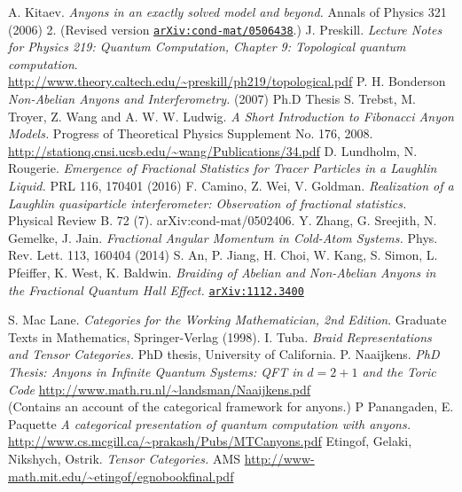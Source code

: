 \begin{thebibliography}{99}
   A. Kitaev. \textit{Anyons in an exactly solved model and beyond.} Annals of Physics 321 (2006) 2. (Revised version \href{https://arxiv.org/abs/cond-mat/0506438}{\texttt{arXiv:cond-mat/0506438}}.)%
   J. Preskill. \textit{Lecture Notes for Physics 219: Quantum Computation, Chapter 9: Topological quantum computation}. \\ \url{http://www.theory.caltech.edu/~preskill/ph219/topological.pdf}
   P. H. Bonderson \textit{Non-Abelian Anyons and Interferometry.} (2007) Ph.D Thesis
   S. Trebst, M. Troyer, Z. Wang and A. W. W. Ludwig. \textit{A Short Introduction to Fibonacci Anyon Models.} Progress of Theoretical Physics Supplement No. 176, 2008. \\ \url{http://stationq.cnsi.ucsb.edu/~wang/Publications/34.pdf}
   D. Lundholm, N. Rougerie. \textit{Emergence of Fractional Statistics for Tracer Particles in a Laughlin Liquid.} PRL 116, 170401 (2016)
   F. Camino, Z. Wei, V. Goldman. \textit{Realization of a Laughlin quasiparticle interferometer: Observation of fractional statistics.} Physical Review B. 72 (7). arXiv:cond-mat/0502406.
   Y. Zhang, G. Sreejith, N. Gemelke, J. Jain. \textit{Fractional Angular Momentum in Cold-Atom Systems.} Phys. Rev. Lett. 113, 160404 (2014)
   S. An, P. Jiang, H. Choi, W. Kang, S. Simon, L. Pfeiffer, K. West, K. Baldwin. \textit{Braiding of Abelian and Non-Abelian Anyons in the Fractional Quantum Hall Effect.} \href{https://arxiv.org/abs/1112.3400}{\texttt{arXiv:1112.3400}}

   S. Mac Lane. \textit{Categories for the Working Mathematician, 2nd Edition}. Graduate Texts in Mathematics, Springer-Verlag (1998).
   I. Tuba. \textit{Braid Representations and Tensor Categories.} PhD thesis, University of California.
   P. Naaijkens. \textit{PhD Thesis: Anyons in Infinite Quantum Systems: QFT in $d=2+1$ and the Toric Code} \url{http://www.math.ru.nl/~landsman/Naaijkens.pdf} \\\relax (Contains an account of the categorical framework for anyons.)
   P Panangaden, E. Paquette \textit{A categorical presentation of quantum computation with anyons.} \\ \url{http://www.cs.mcgill.ca/~prakash/Pubs/MTCanyons.pdf}
   Etingof, Gelaki, Nikshych, Ostrik. \textit{Tensor Categories.} AMS \url{http://www-math.mit.edu/~etingof/egnobookfinal.pdf}


\end{thebibliography}
